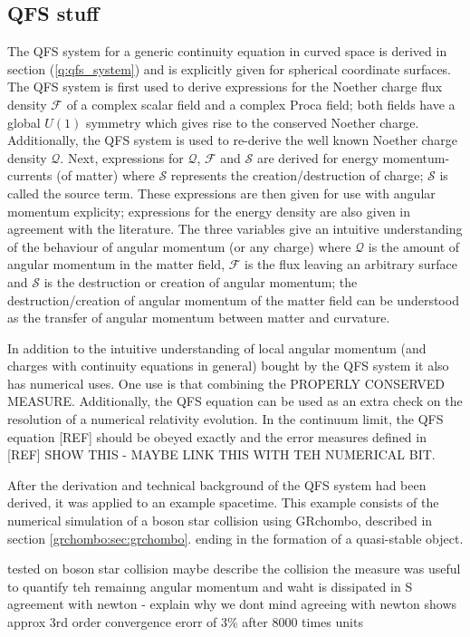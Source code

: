 \subsection{QFS stuff}

The QFS system for a generic continuity equation in curved space is derived in
section (\ref{q:qfs_system}) and is explicitly given for spherical coordinate
surfaces. The QFS system is first used to derive expressions for the Noether charge
flux density $\mathcal{F}$ of a complex scalar field and a complex Proca field;
both fields have a global $U(1)$ symmetry which gives rise to the conserved Noether charge.
Additionally, the QFS system is used to re-derive the well known Noether charge density
$\mathcal{Q}$.
Next, expressions for $\mathcal{Q}$, $\mathcal{F}$ and $\mathcal{S}$ are derived for
energy momentum-currents (of matter) where $\mathcal{S}$ represents the creation/destruction of
charge; $\mathcal{S}$ is called the source term. These expressions are then given for use
with angular momentum explicity; expressions for the energy density are also given
in agreement with the literature. The three variables give an intuitive understanding
of the behaviour of angular momentum (or any charge) where $\mathcal{Q}$ is the amount of
angular momentum in the matter field, $\mathcal{F}$ is the flux leaving an arbitrary
surface and $\mathcal{S}$ is the destruction or creation of angular momentum; the
destruction/creation of angular momentum of the matter field can be understood as
the transfer of angular momentum between matter and curvature.

In addition to the intuitive understanding of local angular momentum (and charges with
continuity equations in general) bought by the QFS system it
also has numerical uses. One use is that combining the PROPERLY CONSERVED MEASURE.
Additionally, the QFS equation can be used as an extra check on the resolution of
a numerical relativity evolution. In the continuum limit, the QFS equation [REF]
should be obeyed exactly and the error measures defined in [REF] SHOW THIS - MAYBE LINK THIS WITH TEH NUMERICAL BIT.


After the derivation and technical background of the QFS system had been derived, it
was applied to an example spacetime. This example consists of the numerical simulation
of a boson star collision using {\sc GRchombo}, described in section \ref{grchombo:sec:grchombo}.
ending in the formation of a quasi-stable object.

tested on boson star collision
maybe describe the collision
the measure was useful to quantify teh remainng angular momentum and waht is dissipated in S
agreement with newton - explain why we dont mind agreeing with newton
shows approx 3rd order convergence
erorr of $3\%$ after 8000 times units





